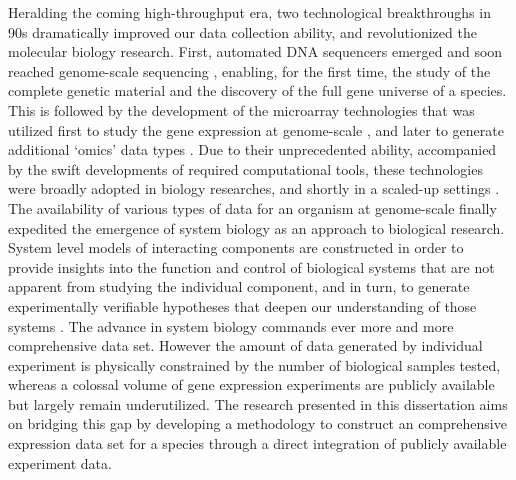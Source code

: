 Heralding the coming high-throughput era, two technological
breakthroughs in 90s dramatically improved our data collection
ability, and revolutionized the molecular biology research.
%
First, automated DNA sequencers emerged and soon reached genome-scale
sequencing \cite{Fleischmann1995}, enabling, for the first time, the
study of the complete genetic material and the discovery of the full
gene universe of a species.
%
%
This is followed by the development of the microarray technologies
\cite{Pease1994, Schena1995} that was utilized first to study the gene
expression at genome-scale \cite{Davis1997}, and later to generate
additional `omics' data types \cite{Blat1999, Uetz2000}.
%
Due to their unprecedented ability, accompanied by the swift
developments of required computational tools, these technologies were
broadly adopted in biology researches, and shortly in a scaled-up
settings \cite{Su2002,Su2004}.
%
The availability of various types of data for an organism at
genome-scale finally expedited the emergence of system biology as an
approach to biological research.  System level models of interacting
components are constructed in order to provide insights into the
function and control of biological systems that are not apparent from
studying the individual component, and in turn, to generate
experimentally verifiable hypotheses that deepen our understanding of
those systems \cite{Ideker2001, Palsson2002}.
%
The advance in system biology commands ever more and more
comprehensive data set.  However the amount of data generated by
individual experiment is physically constrained by the number of
biological samples tested, whereas a colossal volume of gene
expression experiments are publicly available but largely remain
underutilized.
%
The research presented in this dissertation aims on bridging this gap
by developing a methodology to construct an comprehensive expression
data set for a species through a direct integration of publicly
available experiment data.





